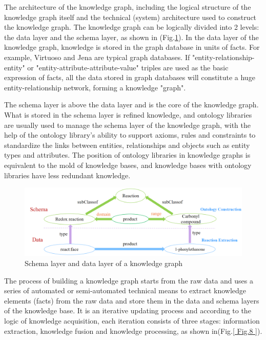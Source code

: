 \documentclass[%
 aip,
 jmp,%
 amsmath,amssymb,
 reprint,%
]{revtex4-2}
\begin{document}
The architecture of the knowledge graph, including the logical structure of the knowledge graph itself and the technical (system) architecture used to construct the knowledge graph\cite{hao2021construction}. The knowledge graph can be logically divided into 2 levels: the data layer and the schema layer, as shown in (Fig.\ref{ Fig.7 }). In the data layer of the knowledge graph, knowledge is stored in the graph database in units of facts. For example, Virtuoso\cite{Virtuoso} and Jena\cite{Jena} are typical graph databases. If "entity-relationship-entity" or "entity-attribute-attribute-value" triples are used as the basic expression of facts, all the data stored in graph databases will constitute a huge entity-relationship network, forming a knowledge "graph". 

The schema layer is above the data layer and is the core of the knowledge graph. What is stored in the schema layer is refined knowledge, and ontology libraries are usually used to manage the schema layer of the knowledge graph, with the help of the ontology library's ability to support axioms\cite{krotzsch2017ontologies}, rules and constraints to standardize the links between entities, relationships and objects such as entity types and attributes. The position of ontology libraries in knowledge graphs is equivalent to the mold of knowledge bases, and knowledge bases with ontology libraries have less redundant knowledge.

\begin{figure}[htbp]
 \centering
 \includegraphics[width=1\textwidth]{figure/7.png}
 \caption{ Schema layer and data layer of a knowledge graph }
 \label{ Fig.7 }
\end{figure}

The process of building a knowledge graph starts from the raw data and uses a series of automated or semi-automated technical means to extract knowledge elements (facts) from the raw data and store them in the data and schema layers of the knowledge base\cite{gutierrez2021knowledge}. It is an iterative updating process and according to the logic of knowledge acquisition\cite{dai2019distantly}, each iteration consists of three stages: information extraction, knowledge fusion and knowledge processing, as shown in(Fig.\ref{ Fig.8 }). 
\end{document}
